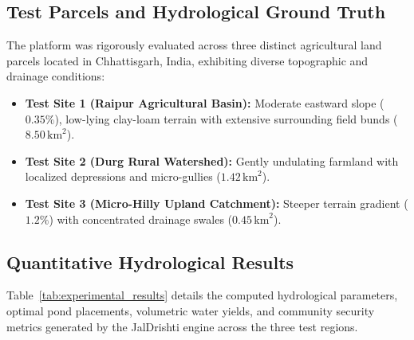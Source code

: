 \documentclass[11pt,a4paper]{article}
\begin{document}
\subsection{Test Parcels and Hydrological Ground Truth}
The platform was rigorously evaluated across three distinct agricultural land parcels located in Chhattisgarh, India, exhibiting diverse topographic and drainage conditions:
\begin{itemize}[noitemsep,topsep=2pt]
    \item \textbf{Test Site 1 (Raipur Agricultural Basin):} Moderate eastward slope ($0.35\%$), low-lying clay-loam terrain with extensive surrounding field bunds ($8.50\,\text{km}^2$).
    \item \textbf{Test Site 2 (Durg Rural Watershed):} Gently undulating farmland with localized depressions and micro-gullies ($1.42\,\text{km}^2$).
    \item \textbf{Test Site 3 (Micro-Hilly Upland Catchment):} Steeper terrain gradient ($1.2\%$) with concentrated drainage swales ($0.45\,\text{km}^2$).
\end{itemize}

\subsection{Quantitative Hydrological Results}
Table~\ref{tab:experimental_results} details the computed hydrological parameters, optimal pond placements, volumetric water yields, and community security metrics generated by the JalDrishti engine across the three test regions.
\end{document}
